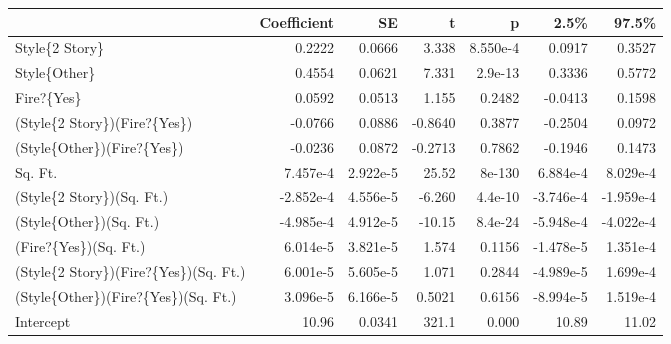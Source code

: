 \begin{tabular}{lrrrrrr}
\toprule
{} &  Coefficient &       SE &       t &        p &      2.5\% &     97.5\% \\
\midrule
Style\{2 Story\}                        &       0.2222 &   0.0666 &   3.338 & 8.550e-4 &    0.0917 &    0.3527 \\
Style\{Other\}                          &       0.4554 &   0.0621 &   7.331 &  2.9e-13 &    0.3336 &    0.5772 \\
Fire?\{Yes\}                            &       0.0592 &   0.0513 &   1.155 &   0.2482 &   -0.0413 &    0.1598 \\
(Style\{2 Story\})(Fire?\{Yes\})          &      -0.0766 &   0.0886 & -0.8640 &   0.3877 &   -0.2504 &    0.0972 \\
(Style\{Other\})(Fire?\{Yes\})            &      -0.0236 &   0.0872 & -0.2713 &   0.7862 &   -0.1946 &    0.1473 \\
Sq. Ft.                               &     7.457e-4 & 2.922e-5 &   25.52 &   8e-130 &  6.884e-4 &  8.029e-4 \\
(Style\{2 Story\})(Sq. Ft.)             &    -2.852e-4 & 4.556e-5 &  -6.260 &  4.4e-10 & -3.746e-4 & -1.959e-4 \\
(Style\{Other\})(Sq. Ft.)               &    -4.985e-4 & 4.912e-5 &  -10.15 &  8.4e-24 & -5.948e-4 & -4.022e-4 \\
(Fire?\{Yes\})(Sq. Ft.)                 &     6.014e-5 & 3.821e-5 &   1.574 &   0.1156 & -1.478e-5 &  1.351e-4 \\
(Style\{2 Story\})(Fire?\{Yes\})(Sq. Ft.) &     6.001e-5 & 5.605e-5 &   1.071 &   0.2844 & -4.989e-5 &  1.699e-4 \\
(Style\{Other\})(Fire?\{Yes\})(Sq. Ft.)   &     3.096e-5 & 6.166e-5 &  0.5021 &   0.6156 & -8.994e-5 &  1.519e-4 \\
Intercept                             &        10.96 &   0.0341 &   321.1 &    0.000 &     10.89 &     11.02 \\
\bottomrule
\end{tabular}
